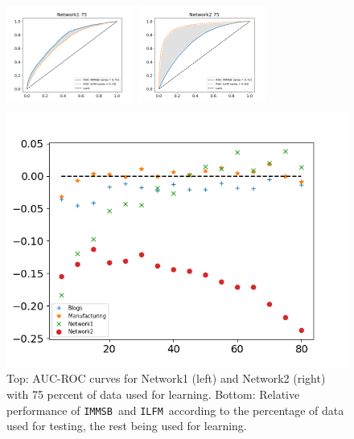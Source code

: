 \documentclass{llncs}
\newcommand{\ifm}{\texttt{ILFM}}
\newcommand{\imb}{\texttt{IMMSB}}
\begin{document}
\begin{figure}[h]
\centering
    \begin{minipage}{0.45\textwidth}
        \includegraphics[width=4.22cm,height=3.5cm]{img/corpus/roc_network1_75_f}
    \end{minipage}
    \begin{minipage}{0.45\textwidth}
        \includegraphics[width=4.22cm,height=3.5cm]{img/corpus/roc_network2_75_f}
    \end{minipage}
    \begin{minipage}{0.4\textwidth}
        \includegraphics[width=\textwidth]{img/corpus/testset_max_20.png}
    \end{minipage}
    \caption{Top: AUC-ROC curves for Network1 (left) and Network2 (right) with 75 percent of data used for learning. Bottom: Relative performance of \imb\ and \ifm\ according to the percentage of data used for testing, the rest being used for learning.} 
\label{fig:auc}
\end{figure}
\end{document}
